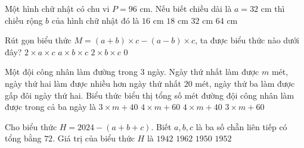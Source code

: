 \begin{ex} %
Một hình chữ nhật có chu vi $P = 96\text{ cm}$. Nếu biết chiều dài là $a = 32\text{ cm}$ thì chiều rộng $b$ của hình chữ nhật đó là
\choice
{\True $16\text{ cm}$}
{$18\text{ cm}$}
{$32\text{ cm}$}
{$64\text{ cm}$}
\end{ex}

\begin{ex} %
Rút gọn biểu thức $M = (a + b) \times c - (a - b) \times c$, ta được biểu thức nào dưới đây?
\choice
{$2 \times a \times c$}
{$a \times b \times c$}
{\True $2 \times b \times c$}
{$0$}
\end{ex}

\begin{ex} %
Một đội công nhân làm đường trong 3 ngày. Ngày thứ nhất làm được $m$ mét, ngày thứ hai làm được nhiều hơn ngày thứ nhất $20$ mét, ngày thứ ba làm được gấp đôi ngày thứ hai. Biểu thức biểu thị tổng số mét đường đội công nhân làm được trong cả ba ngày là
\choice
{$3 \times m + 40$}
{\True $4 \times m + 60$}
{$4 \times m + 40$}
{$3 \times m + 60$}
\end{ex}

\begin{ex} %
Cho biểu thức $H = 2024 - (a + b + c)$. Biết $a, b, c$ là ba số chẵn liên tiếp có tổng bằng $72$. Giá trị của biểu thức $H$ là
\choice
{$1942$}
{$1962$}
{$1950$}
{\True $1952$}
\end{ex}

